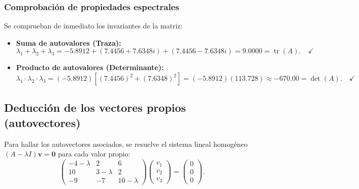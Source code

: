 \documentclass[spanish,letterpaper,oneside]{article}
\begin{document}
\subsubsection*{Comprobación de propiedades espectrales}
Se comprueban de inmediato los invariantes de la matriz:
\begin{itemize}
\item \textbf{Suma de autovalores (Traza):}
\begin{equation*}
\lambda_1 + \lambda_2 + \lambda_3 = -5.8912 + (7.4456 + 7.6348i) + (7.4456 - 7.6348i) = 9.0000 = \operatorname{tr}(A). \quad \checkmark
\end{equation*}
\item \textbf{Producto de autovalores (Determinante):}
\begin{equation*}
\lambda_1 \cdot \lambda_2 \cdot \lambda_3 = (-5.8912)\left[(7.4456)^2 + (7.6348)^2\right] = (-5.8912)(113.728) \approx -670.00 = \det(A). \quad \checkmark
\end{equation*}
\end{itemize}

\subsection{Deducción de los vectores propios (autovectores)}

Para hallar los autovectores asociados, se resuelve el sistema lineal homogéneo $(A - \lambda I)\mathbf{v} = \mathbf{0}$ para cada valor propio:
\begin{equation}
\begin{pmatrix}
-4 - \lambda & 2 & 6 \\
10 & 3 - \lambda & 2 \\
-9 & -7 & 10 - \lambda
\end{pmatrix}
\begin{pmatrix} v_1 \\ v_2 \\ v_3 \end{pmatrix} =
\begin{pmatrix} 0 \\ 0 \\ 0 \end{pmatrix}.
\end{equation}
\end{document}
